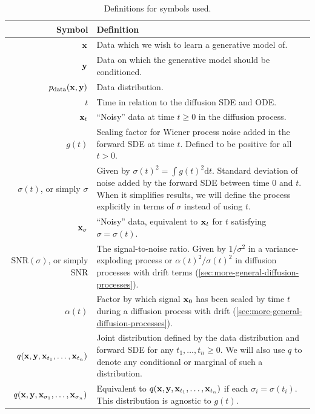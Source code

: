 \begin{table}
  \caption{Definitions for symbols used.}
  \label{tab:notation}
  \centering
  \begin{tabular}{rp{8cm}}
    \toprule
    Symbol    & Definition   \\
    \midrule
    ${\mathbf{x}}$                                  & Data which we wish to learn a generative model of. \\
    ${\mathbf{y}}$                                  & Data on which the generative model should be conditioned. \\
    $p_{\rm{data}}({\mathbf{x}}, {\mathbf{y}})$                    & Data distribution. \\
    \midrule
    $t$                                     & Time in relation to the diffusion SDE and ODE.  \\
    ${\mathbf{x}}_t$                                & ``Noisy'' data at time $t \geq 0$ in the diffusion process.  \\
    $g(t)$                                  & Scaling factor for Wiener process noise added in the forward SDE at time $t$. Defined to be positive for all $t > 0$. \\
    $\sigma(t)$, or simply $\sigma$        & Given by $\sigma(t)^2 = \int g(t)^2 \mathrm{d}t$. Standard deviation of noise added by the forward SDE between time $0$ and $t$. When it simplifies results, we will define the process explicitly in terms of $\sigma$ instead of using $t$. \\
    ${\mathbf{x}}_\sigma$                           & ``Noisy'' data, equivalent to ${\mathbf{x}}_t$ for $t$ satisfying $\sigma = \sigma(t)$. \\
    $\text{SNR}(\sigma)$, or simply SNR       & The signal-to-noise ratio. Given by $1/\sigma^2$ in a variance-exploding process or $\alpha(t)^2 / \sigma(t)^2$ in diffusion processes with drift terms (\cref{sec:more-general-diffusion-processes}). \\
    $\alpha(t)$                             & Factor by which signal ${\mathbf{x}}_0$ has been scaled by time $t$ during a diffusion process with drift (\cref{sec:more-general-diffusion-processes}). \\
    $q({\mathbf{x}},{\mathbf{y}},{\mathbf{x}}_{t_1},\ldots,{\mathbf{x}}_{t_n})$   & Joint distribution defined by the data distribution and forward SDE for any $t_1,\ldots,t_n \geq 0$. We will also use $q$ to denote any conditional or marginal of such a distribution.  \\
    $q({\mathbf{x}},{\mathbf{y}},{\mathbf{x}}_{\sigma_1},\ldots,{\mathbf{x}}_{\sigma_n})$   & Equivalent to $q({\mathbf{x}},{\mathbf{y}},{\mathbf{x}}_{t_1},\ldots,{\mathbf{x}}_{t_n})$ if each $\sigma_i = \sigma(t_i)$. This distribution is agnostic to $g(t)$. \\
    \bottomrule
  \end{tabular}
\end{table}

